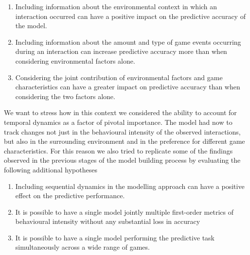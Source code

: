 \begin{enumerate}
    \item Including information about the environmental context in which an interaction occurred can have a positive impact on the predictive accuracy of the model.
    \item Including information about the amount and type of game events occurring during an interaction can increase predictive accuracy more than when considering environmental factors alone. 
    \item Considering the joint contribution of environmental factors and game characteristics can have a greater impact on predictive accuracy than when considering the two factors alone.  
\end{enumerate}
We want to stress how in this context we considered the ability to account for temporal dynamics as a factor of pivotal importance. The model had now to track changes not just in the behavioural intensity of the observed interactions, but also in the surrounding environment and in the preference for different game characteristics. For this reason we also tried to replicate some of the findings observed in the previous stages of the model building process by evaluating the following additional hypotheses
\begin{enumerate}
    \item Including sequential dynamics in the modelling approach can have a positive effect on the predictive performance.
    \item It is possible to have a single model jointly multiple first-order metrics of behavioural intensity without any substantial loss in accuracy
    \item It is possible to have a single model performing the predictive task simultaneously across a wide range of games.
\end{enumerate}

